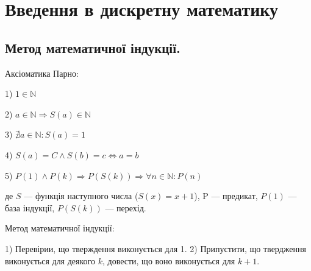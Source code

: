 \chapter{Введення в дискретну математику}

\section{Метод математичної індукції.}

\begin{center}
    Аксіоматика Парно:
\end{center}

1) $1 \in \mathbb{N}$\par
2) $a \in \mathbb{N} \Rightarrow S(a) \in \mathbb{N}$\par
3) $\nexists a \in \mathbb{N}: S(a) = 1$\par
4) $S(a) = C \wedge S(b) = c \Leftrightarrow a = b$\par
5) $P(1) \wedge P(k) \Rightarrow P(S(k)) \Rightarrow \forall n \in \mathbb{N}: P(n)$\par

де $S$ --- функція наступного числа ($S(x) = x+1$), P --- предикат, $P(1)$ --- база індукції,
$P(S(k))$ --- перехід.

\begin{center}
    Метод математичної індукції:
\end{center}

1) Перевірии, що тверждення виконується для 1.
2) Припустити, що твердження виконується для деякого $k$, довести, що воно виконується для $k+1$.

